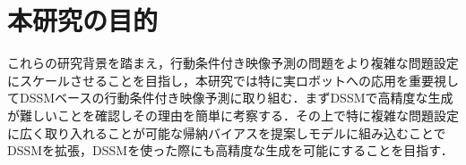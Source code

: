 \section{本研究の目的}

これらの研究背景を踏まえ，行動条件付き映像予測の問題をより複雑な問題設定にスケールさせることを目指し，本研究では特に実ロボットへの応用を重要視してDSSMベースの行動条件付き映像予測に取り組む．まずDSSMで高精度な生成が難しいことを確認しその理由を簡単に考察する．その上で特に複雑な問題設定に広く取り入れることが可能な帰納バイアスを提案しモデルに組み込むことでDSSMを拡張，DSSMを使った際にも高精度な生成を可能にすることを目指す．









